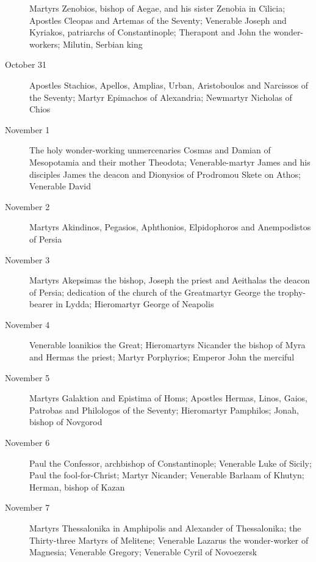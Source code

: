 \begin{description}
Martyrs Zenobios, bishop of Aegae, and his sister Zenobia in Cilicia; Apostles Cleopas and Artemas of the Seventy; Venerable Joseph and Kyriakos, patriarchs of Constantinople; Therapont and John the wonder-workers; Milutin, Serbian king

\item[October 31]

Apostles Stachios, Apellos, Amplias, Urban, Aristoboulos and Narcissos of the Seventy; Martyr Epimachos of Alexandria; Newmartyr Nicholas of Chios

\item[November 1]

The holy wonder-working unmercenaries Cosmas and Damian of Mesopotamia and their mother Theodota; Venerable-martyr James and his disciples James the deacon and Dionysios of Prodromou Skete on Athos; Venerable David

\item[November 2]

Martyrs Akindinos, Pegasios, Aphthonios, Elpidophoros and Anempodistos of Persia

\item[November 3]

Martyrs Akepsimas the bishop, Joseph the priest and Aeithalas the deacon of Persia; dedication of the church of the Greatmartyr George the trophy-bearer in Lydda; Hieromartyr George of Neapolis

\item[November 4]

Venerable loanikios the Great; Hieromartyrs Nicander the bishop of Myra and Hermas the priest; Martyr Porphyrios; Emperor John the merciful

\item[November 5]

Martyrs Galaktion and Epistima of Homs; Apostles Hermas, Linos, Gaios, Patrobas and Philologos of the Seventy; Hieromartyr Pamphilos; Jonah, bishop of Novgorod

\item[November 6]

Paul the Confessor, archbishop of Constantinople; Venerable Luke of Sicily; Paul the fool-for-Christ; Martyr Nicander; Venerable Barlaam of Khutyn; Herman, bishop of Kazan

\item[November 7]

Martyrs Thessalonika in Amphipolis and Alexander of Thessalonika; the Thirty-three Martyrs of Melitene; Venerable Lazarus the wonder-worker of Magnesia; Venerable Gregory; Venerable Cyril of Novoezersk


\end{description}
